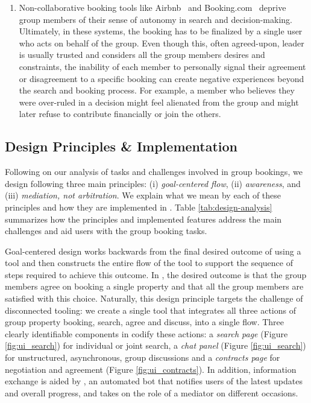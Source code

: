 \begin{enumerate}[label={}, leftmargin=0cm, itemindent=0.2cm]
\item \cLackOfAutonomy 
Non-collaborative booking tools like Airbnb~\cite{airbnb} and Booking.com~\cite{booking} deprive group members of their sense of autonomy in search and decision-making. Ultimately, in these systems, the booking has to be finalized by a single user who acts on behalf of the group. Even though this, often agreed-upon, leader is usually trusted and considers all the group members desires and constraints, the inability of each member to personally signal their agreement or disagreement to a specific booking can create negative experiences beyond the search and booking process. For example, a member who believes they were over-ruled in a decision might feel alienated from the group and might later refuse to contribute financially or join the others.  

    
    
\end{enumerate}

\subsection{Design Principles \& Implementation}
\label{ssection:principles}

Following on our analysis of tasks and challenges involved in group bookings, we design \tool following three main principles: (i) \textit{goal-centered flow}, (ii) \textit{awareness}, and (iii) \textit{mediation, not arbitration}. We explain what we mean by each of these principles and how they are implemented in \tool. Table \ref{tab:design-analysis} summarizes how the principles and implemented features address the main challenges and aid users with the group booking tasks.



\pGoalCenteredFlow Goal-centered design works backwards from the final desired outcome of using a tool and then constructs the entire flow of the tool to support the sequence of steps required to achieve this outcome. In \tool, the desired outcome is that the group members agree on booking a single property and that all the group members are satisfied with this choice. Naturally, this design principle targets the challenge of disconnected tooling: we create a single tool that integrates all three actions of group property booking, search, agree and discuss, into a single flow. Three clearly identifiable components in \tool codify these actions: a \textit{search page} (Figure \ref{fig:ui_search}) for individual or joint search, a \textit{chat panel} (Figure \ref{fig:ui_search}) for unstructured, asynchronous, group discussions and a \textit{contracts page} for negotiation and agreement (Figure \ref{fig:ui_contracts}). In addition, information exchange is aided by \cbot, an automated bot that notifies users of the latest updates and overall progress, and takes on the role of a mediator on different occasions.



